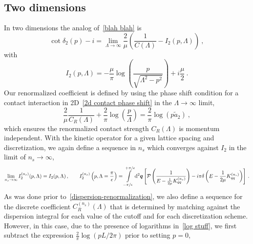 \subsection{Two dimensions}

In two dimensions the analog of~\eqref{blah blah} is
\begin{equation}
\cot \delta_2(p) - i =\lim_{\Lambda\to\infty}\frac{2}{\mu}\left(\frac{1}{C(\Lambda)}- I_2(p, \Lambda)\right)\ , %
\end{equation}
with
\begin{equation}
I_2(p, \Lambda)
=
-\frac{\mu}{\pi } \log \left(\frac{p}{\sqrt{\Lambda ^2-p^2}}\right)
+ i\frac{\mu }{2}
\ .
\end{equation}
Our renormalized coefficient is defined by using the phase shift condition for a contact interaction in 2D~\eqref{2d contact phase shift} in the $\Lambda\to\infty$ limit,
\begin{equation}\label{eq:log stuff}
	\frac{2}{\mu}\frac{1}{C_R(\Lambda)} + \frac{2}{\pi } \log \left(\frac{p}{\Lambda}\right)
	=
	\frac { 2 } { \pi } \log \left( p \tilde a _ { 2 } \right)\ ,
\end{equation}
which ensures the renormalized contact strength $C_R(\Lambda)$ is momentum independent.
With the kinetic operator for a given lattice spacing and discretization, we again define a sequence in $n_s$ which converges against $I_2$ in the limit of $n_s \to \infty$,
\begin{equation}
	\lim\limits_{n_s \to \infty} I^{(n_s)}_2(p, \Lambda) = I_2(p, \Lambda)
	\, , \qquad
	I^{(n_s)}_2\left(p, \Lambda=\frac{\pi}{\epsilon} \right)
	=
	    \int\limits_{-\pi/\epsilon}^{+\pi/\epsilon}
        \mathrm{d}^2 \boldsymbol{q}
        \left[
            \mathcal{P} \left(
                \frac{1}{
                    E - \frac{1}{2\mu} K_{qq}^{(n_s)} }
                \right)
            -i \pi \delta\left(E - \frac{1}{2\mu}K_{qq}^{(n_s)}\right)
        \right]
        \, .
\end{equation}
As was done prior to~\eqref{dispersion-renormalization}, we also define a sequence for the discrete coefficient $C^{(n_s)}_R(\Lambda)$ that is determined by matching against the dispersion integral for each value of the cutoff and for each discretization scheme.  However, in this case, due to the presence of logarithms in~\eqref{log stuff}, we first subtract the expression $\frac{2}{\pi}\log(pL/2\pi)$ prior to setting $p=0$,
